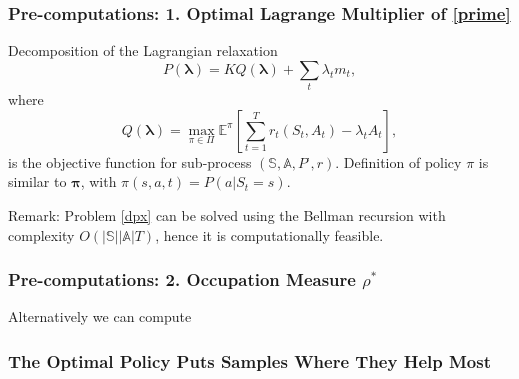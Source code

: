 \documentclass{beamer}
\newcommand{\lambdav}{\pmb{\lambda}}
\newcommand{\allp}{\pmb{\pi}}
\newcommand{\subp}{\pi}
\newcommand{\subpset}{\Pi}
\newcommand{\subr}{r}
\newcommand{\substates}{\mathbb{S}}
\newcommand{\substater}{S}
\newcommand{\substate}{s}
\newcommand{\subactions}{\mathbb{A}}
\newcommand{\subar}{A}
\newcommand{\subpr}{P}
\newcommand{\subaction}{a}
\begin{document}
\begin{frame}
\frametitle{Pre-computations: 1. Optimal Lagrange Multiplier of \eqref{prime}}
Decomposition of the Lagrangian relaxation
\begin{equation}\label{dec}
P(\lambdav)=K Q(\lambdav) + \sum_t\lambda_t m_t,
\end{equation}
where
\begin{equation}\label{dpx}
Q(\lambdav)=\max_{\subp\in \subpset}\mathbb{E}^{\subp}\left[\sum_{t=1}^{T}\subr_t(\substater_t,\subar_t)-\lambda_t \subar_t\right],
\end{equation}
is the objective function for sub-process $(\substates,\subactions,\subpr^{\cdot},\subr)$. Definition of policy $\subp$ is similar to $\allp$, with  $\subp(\substate,\subaction,t) = P(\subaction|\substater_t=\substate)$.

\vspace{0.5cm}
Remark: Problem \eqref{dpx} can be solved using the Bellman recursion with complexity $O(|\substates||\subactions|T)$,  hence it is computationally feasible.
\end{frame}

\begin{frame}
\frametitle{Pre-computations: 2. Occupation Measure $\rho^*$}
Alternatively we can compute $$
\end{frame}

\begin{frame}
\frametitle{The Optimal Policy Puts Samples Where They Help Most}
\end{frame}
\end{document}
